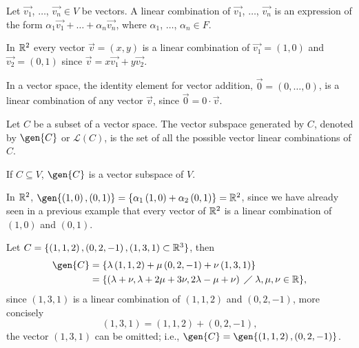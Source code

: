 \begin{defi}
    Let $\vec{v_1}$, $\ldots$, $\vec{v_n}\in V$ be vectors. A linear combination of $\vec{v_1}$, $\ldots$,
    $\vec{v_n}$ is an expression of the form $\alpha_1\vec{v_1} + \ldots + \alpha_n\vec{v_n}$, where
    $\alpha_1$, $\ldots$, $\alpha_n\in F$.
\end{defi}

\begin{example}
    In $\mathbb{R}^2$ every vector $\vec{v} = \left(x, y\right)$ is a linear combination of $\vec{v_1} =
    \left( 1, 0 \right) $ and $\vec{v_2} = \left( 0, 1 \right) $ since $\vec{v} = x\vec{v_1} + y\vec{v_2}$.
\end{example}

\begin{prop}
    In a vector space, the identity element for vector addition, $\vec{0} = \left( 0, \ldots, 0 \right) $, is
    a linear combination of any vector $\vec{v}$, since $\vec{0} = 0\cdot\vec{v}$.
\end{prop}

\begin{defi}
    Let $C$ be a subset of a vector space. The vector subspace generated by $C$, denoted by $\gen{C}$ or
    $\mathcal{L}\left( C \right) $, is the set of all the possible vector linear combinations of $C$.
\end{defi}

\begin{prop}
    If $C\subseteq V$, $\gen{C}$ is a vector subspace of $V$.
\end{prop}

\begin{example}
    In $\mathbb{R}^2$, $\gen{\left( 1, 0 \right) , \left( 0, 1 \right) } = \{\alpha_1\left( 1, 0 \right) +
    \alpha_2\left( 0, 1 \right) \} = \R^2 $, since we have already seen in a previous example that every
    vector of $\mathbb{R}^2$ is a linear combination of $\left( 1, 0 \right) $ and $\left( 0, 1 \right) $.
\end{example}

\begin{example}
    Let $C = \{\left( 1, 1, 2 \right), \left( 0, 2, -1 \right), \left( 1, 3, 1 \right) \subset\mathbb{R}^3\} $, then
    \begin{align}
        \gen{C} &= \{\lambda\left( 1, 1, 2 \right) + \mu\left( 0, 2, -1 \right) + \nu\left( 1, 3, 1 \right)\}
             \\ &= \{\left( \lambda + \nu, \lambda + 2\mu + 3\nu, 2\lambda - \mu + \nu \right) \st\lambda,
              \mu, \nu\in\R\},
    \end{align}
    since $\left( 1, 3, 1 \right) $ is a linear combination of $\left( 1, 1, 2 \right) $ and $\left( 0, 2, -1
    \right) $, more concisely
    \begin{equation}
        \left( 1, 3, 1 \right) = \left( 1, 1, 2 \right) + \left( 0, 2, -1 \right),
    \end{equation}
    the vector $\left( 1, 3, 1 \right) $ can be omitted; i.e., $\gen{C} = \gen{\left( 1, 1, 2 \right), \left(
    0, 2, -1\right) }$.
\end{example}

